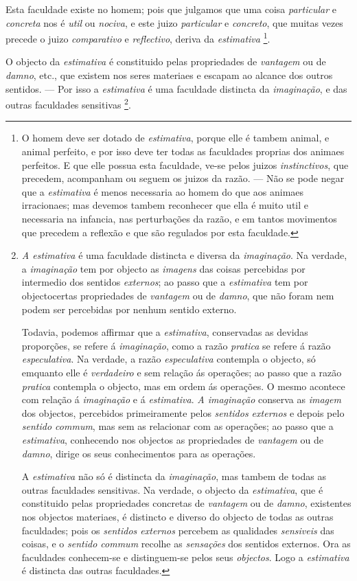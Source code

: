 Esta faculdade existe no homem; pois que julgamos que uma coisa \emph{particular} e \emph{concreta} nos é \emph{util} ou \emph{nociva}, e este juizo \emph{particular} e \emph{concreto}, que muitas vezes precede o juizo \emph{comparativo} e \emph{reflectivo}, deriva da \emph{estimativa} \footnote{O homem deve ser dotado de \emph{estimativa}, porque elle é tambem animal, e animal perfeito, e por isso deve ter todas as faculdades proprias dos animaes perfeitos. E que elle possua esta faculdade, ve-se pelos juizos \emph{instinctivos}, que precedem, acompanham ou seguem os juizos da razão. --- Não se pode negar que a \emph{estimativa} é menos necessaria ao homem do que aos animaes irracionaes; mas devemos tambem reconhecer que ella é muito util e necessaria na infancia, nas perturbações da razão, e em tantos movimentos que precedem a reflexão e que são regulados por esta faculdade.}.


O objecto da \emph{estimativa} é constituido pelas propriedades de \emph{vantagem} ou de \emph{damno}, etc., que existem nos seres materiaes e escapam ao alcance dos outros sentidos. --- Por isso a \emph{estimativa} é uma faculdade distincta da \emph{imaginação}, e das outras faculdades sensitivas \footnote{\emph{A estimativa} é uma faculdade distincta e diversa da \emph{imaginação}. Na verdade, a \emph{imaginação} tem por objecto as \emph{imagens} das coisas percebidas por intermedio dos sentidos \emph{externos}; ao passo que a \emph{estimativa} tem por objectocertas propriedades de \emph{vantagem} ou de \emph{damno}, que não foram nem podem ser percebidas por nenhum sentido externo.\par Todavia, podemos affirmar que a \emph{estimativa}, conservadas as devidas proporções, se refere á \emph{imaginação}, como a razão \emph{pratica} se refere á razão \emph{especulativa}. Na verdade, a razão \emph{especulativa} contempla o objecto, só emquanto elle é \emph{verdadeiro} e sem relação ás operações; ao passo que a razão \emph{pratica} contempla o objecto, mas em ordem ás operações. O mesmo acontece com relação á \emph{imaginação} e á \emph{estimativa}. \emph{A imaginação} conserva as \emph{imagem} dos objectos, percebidos primeiramente pelos \emph{sentidos externos} e depois pelo \emph{sentido commum}, mas sem as relacionar com as operações; ao passo que a \emph{estimativa}, conhecendo nos objectos as propriedades de \emph{vantagem} ou de \emph{damno}, dirige os seus conhecimentos para as operações.\par A \emph{estimativa} não só é distincta da \emph{imaginação}, mas tambem de todas as outras faculdades sensitivas. Na verdade, o objecto da \emph{estimativa}, que é constituido pelas propriedades concretas de \emph{vantagem} ou de \emph{damno}, existentes nos objectos materiaes, é distincto e diverso do objecto de todas as outras faculdades; pois os \emph{sentidos externos} percebem as qualidades \emph{sensiveis} das coisas, e o \emph{sentido commum} recolhe as \emph{sensações} dos sentidos externos. Ora as faculdades conhecem-se e distinguem-se pelos seus \emph{objectos}. Logo a \emph{estimativa} é distincta das outras faculdades.}.

